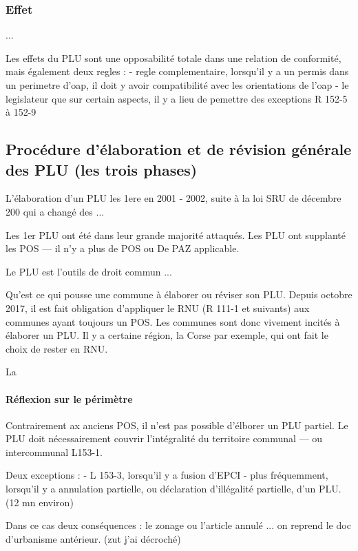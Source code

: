 		\subsubsection{Effet } ...

		Les effets du PLU sont une opposabilité totale dans une relation de conformité, mais également deux regles :
			- regle complementaire, lorsqu'il y a un permis dans un perimetre d'oap, il doit y avoir compatibilité avec les orientations de l'oap
			- le legislateur que sur certain aspects, il y a lieu de pemettre des exceptions R 152-5 à 152-9

	\subsection{Procédure d'élaboration et de révision générale des PLU (les trois phases)}

		L'élaboration d'un PLU les 1ere en 2001 - 2002, suite à la loi SRU de décembre 200 qui a changé des ...

		Les 1er PLU ont été dans leur grande majorité attaqués. Les PLU ont supplanté les POS --- il n'y a plus de POS ou De PAZ applicable.

		Le PLU est l'outils de droit commun ...

		Qu'est ce qui pousse une commune à élaborer ou réviser son PLU. Depuis octobre 2017, il est fait obligation d'appliquer le RNU (R 111-1 et suivants) aux communes ayant toujours un POS. Les communes sont donc vivement incités à élaborer un PLU. Il y a certaine région, la Corse par exemple,  qui ont fait le choix de rester en RNU.

		La

		\paragraph{Réflexion sur le périmètre} Contrairement ax anciens POS, il n'est pas possible d'élborer un PLU partiel. Le PLU doit nécessairement couvrir l'intégralité du territoire communal --- ou intercommunal L153-1.

		Deux exceptions :
			- L 153-3, lorsqu'il y a fusion d'EPCI
			- plus fréquemment, lorsqu'il y a annulation partielle, ou déclaration d'illégalité partielle, d'un PLU.
			(12 mn environ) %

			Dans ce cas deux conséquences : le zonage ou l'article annulé ... on reprend le doc d'urbanisme antérieur.
			(zut j'ai décroché)

